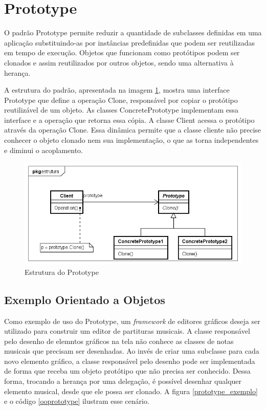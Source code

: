 \section{Prototype}

O padrão Prototype permite reduzir a quantidade 
de subclasses definidas em uma aplicação 
substituindo-as por instâncias predefinidas 
que podem ser reutilizadas em tempo de 
execução. Objetos que funcionam como 
protótipos podem ser clonados e assim 
reutilizados por outros objetos, sendo uma 
alternativa à herança. 

A estrutura do padrão, apresentada na imagem 
\ref{prototype_struct}, mostra uma interface 
Prototype que define a operação Clone, responsável 
por copiar o protótipo reutilizável de um objeto. 
As classes ConcretePrototype implementam essa 
interface e a operação que retorna essa cópia. 
A classe Client acessa o protótipo através da operação 
Clone. Essa dinâmica permite que a classe cliente 
não precise conhecer o objeto clonado nem sua 
implementação, o que as torna independentes e 
diminui o acoplamento.

\begin{figure}[htb]
	\caption{\label{prototype_struct}Estrutura do Prototype}
	\begin{center}
	    \includegraphics[scale=0.5]{5_padroes-contexto-funcional/5.1_criacionais/5.1.4_prototype/prototype_estrutura.png}
	\end{center}
\end{figure}


\subsection*{Exemplo Orientado a Objetos}

Como exemplo de uso do Prototype, um 
\textit{framework} de editores gráficos deseja 
ser utilizado para construir um editor de 
partituras musicais. A classe responsável pelo 
desenho de elemntos gráficos na tela não 
conhece as classes de notas musicais que 
precisam ser desenhadas. Ao invés de criar uma 
subclasse para cada novo elemento gráfico, 
a classe responsável pelo desenho 
pode ser implementada de forma que receba 
um objeto protótipo que não precisa ser 
conhecido. Dessa forma, trocando a herança 
por uma delegação, é possível desenhar qualquer 
elemento musical, desde que ele possa ser 
clonado. A figura \ref{prototype_exemplo} e 
o código \ref{ooprototype} ilustram esse cenário.

